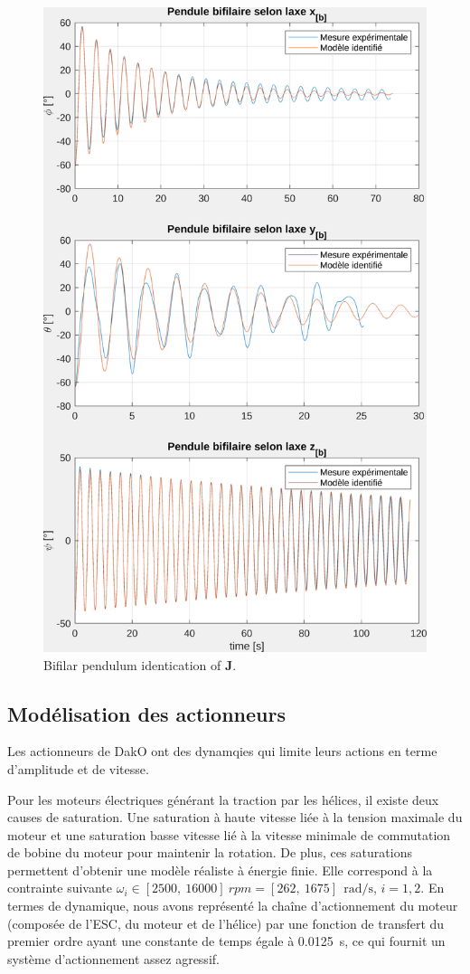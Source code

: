     \begin{figure}[ht]
    \centerline{
    \includegraphics[trim=0cm 0cm 0cm 0cm,clip,width=0.6\columnwidth]{figures/ident_inertia.png}}
    \caption{Bifilar pendulum identication of $\boldsymbol{J}$.}
    \label{fig:BifilarPend_meas}
    \end{figure}

\subsection{Modélisation des actionneurs}
    Les actionneurs de DakO ont des dynamqies qui limite leurs actions en terme d'amplitude et de vitesse.

    Pour les moteurs électriques générant la traction par les hélices, il existe deux causes de saturation. Une saturation à haute vitesse liée à  la tension maximale du moteur et une saturation basse vitesse lié à la vitesse minimale de commutation de bobine du moteur pour maintenir la rotation. De plus, ces saturations permettent d'obtenir une modèle réaliste à énergie finie. Elle correspond à la contrainte suivante  $\omega_i \in [2500,~16000]~rpm = [262,~1675]~\SI{}{\radian\per\second}$, $i=1,2$. En termes de dynamique, nous avons représenté la chaîne d'actionnement du moteur (composée de l'ESC, du moteur et de l'hélice) par une fonction de transfert du premier ordre ayant une constante de temps égale à \SI{0,0125}{\second}, ce qui fournit un système d'actionnement assez agressif.

